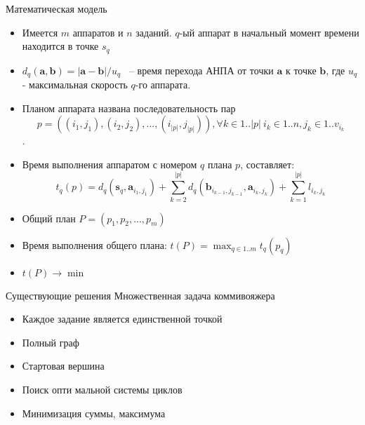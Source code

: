 \documentclass{beamer}
\begin{document}
\begin{frame}{Математическая модель}

\begin{itemize}
\item Имеется $m$ аппаратов и $n$ заданий. $q$-ый аппарат в начальный момент времени находится в точке $s_q$
\item $d_q(\mathbf{a}, \mathbf{b}) = |\mathbf{a} - \mathbf{b}| / u_q$ ~-- время перехода АНПА от точки $\mathbf{a}$ к точке $\mathbf{b}$, где $u_q$ - максимальная скорость $q$-го аппарата.


\item Планом аппарата названа последовательность пар $$p = ((i_1, j_1), (i_2, j_2), ..., (i_{|p|}, j_{|p|})), \forall k \in 1..|p|~ i_k \in 1..n, j_k \in 1..v_{i_k}$$.

\item Время выполнения аппаратом с номером $q$ плана $p$, составляет:
$$
t_q(p) = d_q(\mathbf{s}_q, \mathbf{a}_{i_1, j_1}) + \sum_{k=2}^{|p|} d_q(\mathbf{b}_{i_{k-1}, j_{k - 1}}, \mathbf{a}_{i_k, j_k}) + \sum_{k=1}^{|p|}l_{i_k, j_k}
$$

\item Общий план $P = (p_1, p_2, ..., p_m)$
\item Время выполнения общего плана: $t(P) = \displaystyle \max_{q \in 1..m} t_q(p_q)$

\item $
t(P) \rightarrow \min
$
\end{itemize}

\end{frame}

\begin{frame}{Существующие решения}
Множественная задача коммивояжера
\begin{itemize}
\item Каждое задание является единственной точкой
\item Полный граф
\item Стартовая вершина
\item Поиск опти мальной системы циклов
\item Минимизация суммы, максимума
\end{itemize}
\end{frame}
\end{document}
